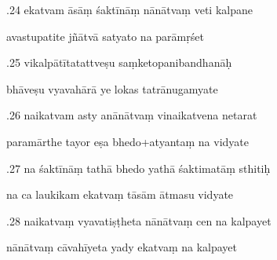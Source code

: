 \documentclass[article,12pt,a4paper]{memoir}%
\newcounter{parCount}
\begin{document}
	  
	  \pstart {}.24 ekatvam āsāṃ śaktīnāṃ nānātvaṃ veti kalpane 
	{}
	\pend%
      

	  
	  \pstart \leavevmode%
	avastupatite jñātvā satyato na parāmṛśet 
	{}
	\pend%
      

	  
	  \pstart {}.25 vikalpātītatattveṣu saṃketopanibandhanāḥ 
	{}
	\pend%
      

	  
	  \pstart \leavevmode%
	bhāveṣu vyavahārā ye lokas tatrānugamyate 
	{}
	\pend%
      

	  
	  \pstart {}.26 naikatvam asty anānātvaṃ vinaikatvena netarat 
	{}
	\pend%
      

	  
	  \pstart \leavevmode%
	paramārthe tayor eṣa bhedo+atyantaṃ na vidyate 
	{}
	\pend%
      

	  
	  \pstart {}.27 na śaktīnāṃ tathā bhedo yathā śaktimatāṃ sthitiḥ 
	{}
	\pend%
      

	  
	  \pstart \leavevmode%
	na ca laukikam ekatvaṃ tāsām ātmasu vidyate 
	{}
	\pend%
      

	  
	  \pstart {}.28 naikatvaṃ vyavatiṣṭheta nānātvaṃ cen na kalpayet 
	{}
	\pend%
      

	  
	  \pstart \leavevmode%
	nānātvaṃ cāvahīyeta yady ekatvaṃ na kalpayet 
	{}
	\pend%
      
\end{document}
